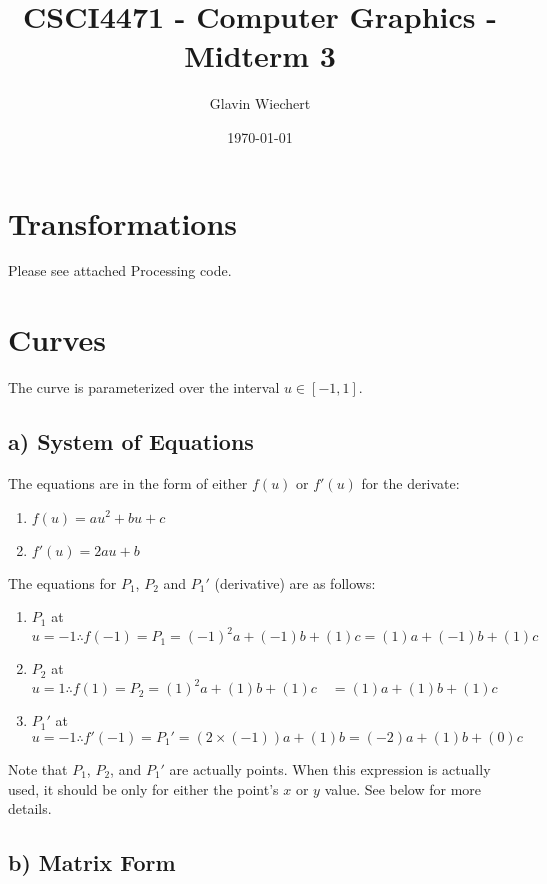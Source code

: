 \documentclass[12pt]{article}
\title{CSCI4471 - Computer Graphics - Midterm 3}
\author{Glavin Wiechert}
\date{\today}
\begin{document}
\maketitle

\section{Transformations}

Please see attached Processing code.

\section{Curves}

The curve is parameterized over the interval $u \in [-1, 1]$.

\subsection*{a) System of Equations}

The equations are in the form of either $f(u)$ or $f'(u)$ for the derivate:

\begin{enumerate}
    \item $f(u) = au^2 + bu + c$
    \item $f'(u) = 2au + b$
\end{enumerate}

The equations for $P_1$, $P_2$ and $P_1'$ (derivative) are as follows:

\begin{enumerate}
    \item $P_1$ at $u=-1 \therefore  f(-1) = P_1 = (-1)^2a + (-1)b + (1)c = (1)a + (-1)b + (1)c$
    \item $P_2$ at $u=1 \therefore   f(1) = P_2 = (1)^2a + (1)b + (1)c  \quad  = (1)a + (1)b + (1)c$
    \item $P_1'$ at $u=-1 \therefore f'(-1) = P_1' = (2\times(-1))a + (1)b = (-2)a + (1)b + (0)c$
\end{enumerate}

Note that $P_1$, $P_2$, and $P_1'$ are actually points. 
When this expression is actually used, 
it should be only for either the point's $x$ or $y$ value.
See below for more details.

\subsection*{b) Matrix Form}
\end{document}
